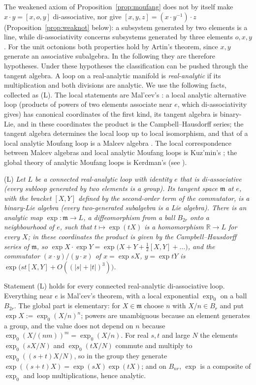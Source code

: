 \documentclass[11pt,reqno]{amsart}
\theoremstyle{definition}
\theoremstyle{remark}
\numberwithin{equation}{section}
\newcommand{\R}{\mathbb{R}}
\newcommand{\hp}[3]{[#1,#2,#3]}
\begin{document}
The weakened axiom of Proposition~\ref{prop:moufang} does not by itself make $x\cdot y=\hp xoy$ di-associative, nor give
$\hp xyz=(x\cdot y^{-1})\cdot z$ (Proposition~\ref{prop:weaknot} below): a subsystem generated by two elements is a line, while
di-associativity concerns subsystems generated by three elements $o,x,y$.  For the unit octonions both properties hold by
Artin's theorem, since $x,y$ generate an associative subalgebra.  In the following they are therefore hypotheses.
Under these hypotheses the classification can be pushed through the tangent algebra.  A loop on a real-analytic manifold is
\emph{real-analytic} if its multiplication and both divisions are analytic.  We use the following facts, collected as (L).  The
local statements are Mal'cev's \cite[Thms.~1,~2]{Malcev55}: a local analytic alternative loop (products of powers of two elements
associate near $e$, which di-associativity gives) has canonical coordinates of the first kind, its tangent algebra is binary-Lie, and in
these coordinates the product is the Campbell--Hausdorff series; the tangent algebra determines the local loop up to local
isomorphism, and that of a local analytic Moufang loop is a Malcev algebra \cite[Thm.~4]{Malcev55}.  The local correspondence between
Malcev algebras and local analytic Moufang loops is Kuz'min's \cite{Kuzmin71}; the global theory of analytic Moufang loops is Kerdman's
\cite{Kerdman} (see \cite{NS02}).

\smallskip\noindent(L) \emph{Let $L$ be a connected real-analytic loop with identity $e$ that is di-associative (every
subloop generated by two elements is a group).  Its tangent space $\mathfrak m$ at $e$, with the bracket $[X,Y]$ defined by
the second-order term of the commutator, is a binary-Lie algebra (every two-generated subalgebra is a Lie algebra).
There is an analytic map $\exp\colon\mathfrak m\to L$, a diffeomorphism from a ball $B_{2r}$ onto a neighbourhood of $e$, such
that $t\mapsto\exp(tX)$ is a homomorphism $\R\to L$ for every $X$; in these coordinates the product is given by the
Campbell--Hausdorff series of $\mathfrak m$, so $\exp X\cdot\exp Y=\exp\bigl(X+Y+\tfrac12[X,Y]+\dots\bigr)$, and the commutator
$(x\cdot y)/(y\cdot x)$ of $x=\exp sX$, $y=\exp tY$ is $\exp\bigl(st[X,Y]+O((\lvert s\rvert+\lvert t\rvert)^3)\bigr)$.}

\smallskip
Statement (L) holds for every connected real-analytic di-associative loop.  Everything near $e$ is Mal'cev's theorem, with a local
exponential $\exp_0$ on a ball $B_{2r}$.  The global part is elementary: for $X\in\mathfrak m$ choose $n$ with $X/n\in B_r$ and put
$\exp X:=\exp_0(X/n)^n$; powers are unambiguous because an element generates a group, and the value does not depend on $n$ because
$\exp_0(X/(nm))^m=\exp_0(X/n)$.  For real $s,t$ and large $N$ the elements $\exp_0(sX/N)$ and $\exp_0(tX/N)$ commute and multiply to
$\exp_0((s+t)X/N)$, so in the group they generate $\exp((s+t)X)=\exp(sX)\exp(tX)$; and on $B_{nr}$, $\exp$ is a composite of $\exp_0$ and
loop multiplications, hence analytic.
\end{document}
